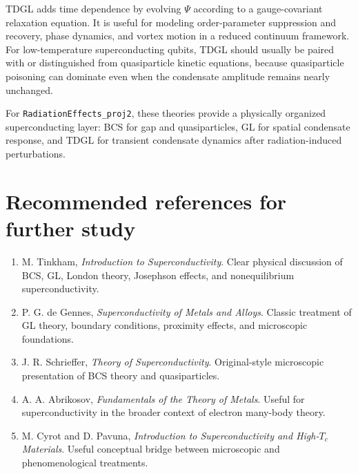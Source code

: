 \documentclass[11pt]{article}
\numberwithin{equation}{section}
\begin{document}
TDGL adds time dependence by evolving $\Psi$ according to a gauge-covariant relaxation equation. It is useful for modeling order-parameter suppression and recovery, phase dynamics, and vortex motion in a reduced continuum framework. For low-temperature superconducting qubits, TDGL should usually be paired with or distinguished from quasiparticle kinetic equations, because quasiparticle poisoning can dominate even when the condensate amplitude remains nearly unchanged.

For \texttt{RadiationEffects\_proj2}, these theories provide a physically organized superconducting layer: BCS for gap and quasiparticles, GL for spatial condensate response, and TDGL for transient condensate dynamics after radiation-induced perturbations.

\section*{Recommended references for further study}

\begin{enumerate}[leftmargin=2em]
\item M. Tinkham, \textit{Introduction to Superconductivity}. Clear physical discussion of BCS, GL, London theory, Josephson effects, and nonequilibrium superconductivity.
\item P. G. de Gennes, \textit{Superconductivity of Metals and Alloys}. Classic treatment of GL theory, boundary conditions, proximity effects, and microscopic foundations.
\item J. R. Schrieffer, \textit{Theory of Superconductivity}. Original-style microscopic presentation of BCS theory and quasiparticles.
\item A. A. Abrikosov, \textit{Fundamentals of the Theory of Metals}. Useful for superconductivity in the broader context of electron many-body theory.
\item M. Cyrot and D. Pavuna, \textit{Introduction to Superconductivity and High-$T_c$ Materials}. Useful conceptual bridge between microscopic and phenomenological treatments.
\end{enumerate}
\end{document}
